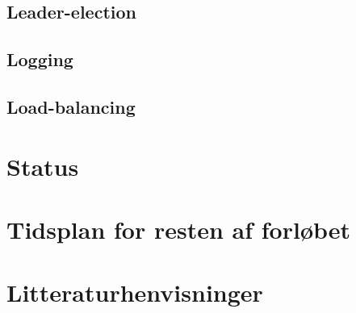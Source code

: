 \documentclass[a4paper,12pt]{article}
\begin{document}
\subsection*{Leader-election}


\subsection*{Logging}


\subsection*{Load-balancing}



\section*{Status}


\section*{Tidsplan for resten af forløbet}





\section*{Litteraturhenvisninger}
\end{document}
